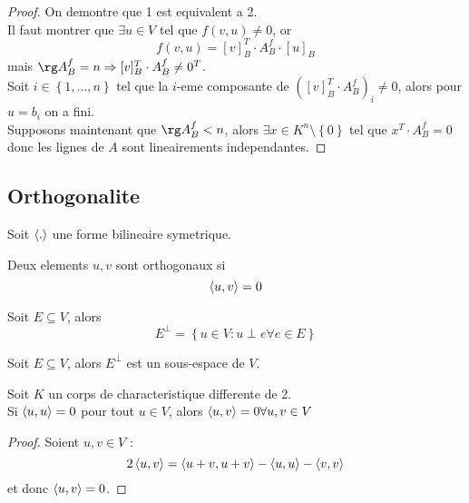 \documentclass[../main.tex]{subfiles}
\begin{document}
\begin{proof}
On demontre que 1 est equivalent a 2.\\
Il faut montrer que $\exists u \in V $ tel que $f( v,u) \neq 0$, or
\[ 
	f( v,u) = [ v] _B ^{T} \cdot A_B^{f} \cdot [ u] _B
\]
mais $\rg A_B^{f}=n \Rightarrow  [ v]_B^{T}\cdot A_B^{f}\neq 0^{T}$.\\
Soit $i \in  \left\{ 1, \ldots, n \right\} $ tel que la $i$-eme composante de $( [v]_B^{T}\cdot A_B^{f} )_i \neq 0$, alors pour $u=b_i$ on a fini.\\
Supposons maintenant que $\rg A_{B} ^{f}<n$, alors
$\exists x \in K^{n}\setminus \left\{ 0 \right\} $ tel que $x^{T}\cdot A_B^{f}=0$ \\
donc les lignes de $A$ sont lineairements independantes.
\end{proof}
\subsection{Orthogonalite}
Soit $\left\langle.\right\rangle$ une forme bilineaire symetrique.
\begin{defn}[Orthogonalite]
	Deux elements $u,v$ sont orthogonaux si
	\[ 
	\left\langle u,v\right\rangle =0
	\]
	
	
\end{defn}
\begin{defn}
	Soit $E \subseteq V$, alors
	\[ 
	E^{\perp}= \left\{ u \in V: u \perp e \forall e  \in E \right\} 
	\]
	
	
\end{defn}
\begin{propo}
Soit $E \subseteq V$, alors $E^{\perp}$ est un sous-espace de $V$.
\end{propo}
\begin{lemma}
Soit $K$ un corps de characteristique differente de 2.\\
Si $ \left\langle u,u \right\rangle =0$ pour tout $u \in V$, alors $\left\langle u,v\right\rangle =0 \forall u,v \in V$
\end{lemma}
\begin{proof}
Soient $u,v \in V$ :
\[ 
2 \left\langle u,v\right\rangle = \left\langle u+v, u+v\right\rangle - \left\langle u,u\right\rangle - \left\langle v,v\right\rangle 
\]
et donc $\left\langle u,v \right\rangle =0$.

\end{proof}
\end{document}
